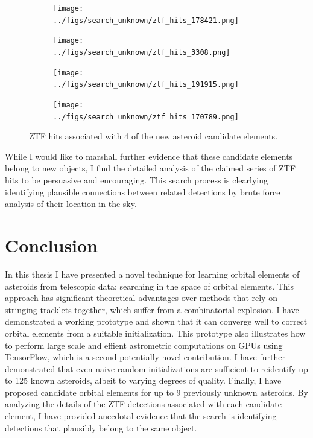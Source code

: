\begin{figure}[h]
\begin{subfigure}[t]{0.45\textwidth}
\centering
\texttt{[image: ../figs/search\_unknown/ztf\_hits\_178421.png]}
\end{subfigure}
\hfill
\begin{subfigure}[t]{0.45\textwidth}
\centering
\texttt{[image: ../figs/search\_unknown/ztf\_hits\_3308.png]}
\end{subfigure}
\bigskip
\begin{subfigure}[t]{0.45\textwidth}
\centering
\texttt{[image: ../figs/search\_unknown/ztf\_hits\_191915.png]}
\end{subfigure}
\hfill
\begin{subfigure}[t]{0.45\textwidth}
\centering
\texttt{[image: ../figs/search\_unknown/ztf\_hits\_170789.png]}
\end{subfigure}
\caption{ZTF hits associated with 4 of the new asteroid candidate elements.}
\label{fig:ZTF_Hits}
\end{figure}

While I would like to marshall further evidence that these candidate elements belong to new objects,
I find the detailed analysis of the claimed series of ZTF hits to be persuasive and encouraging.
This search process is clearlying identifying plausible connections between related detections 
by brute force analysis of their location in the sky.

\section{Conclusion}
\label{search_conclusion}
In this thesis I have presented a novel technique for learning orbital elements of asteroids from telescopic data: searching in the space of orbital elements.
This approach has significant theoretical advantages over methods that rely on stringing tracklets together, which suffer from a combinatorial explosion.
I have demonstrated a working prototype and shown that it can converge well to correct orbital elements from a suitable initialization.
This prototype also illustrates how to perform large scale and effient astrometric computations on GPUs using TensorFlow,
which is a second potentially novel contribution.
I have further demonstrated that even naive random initializations are sufficient to reidentify up to 125 known asteroids, albeit to varying degrees of quality.
Finally, I have proposed candidate orbital elements for up to 9 previously unknown asteroids.
By analyzing the details of the ZTF detections associated with each candidate element,
I have provided anecdotal evidence that the search is identifying detections that plausibly belong to the same object.


